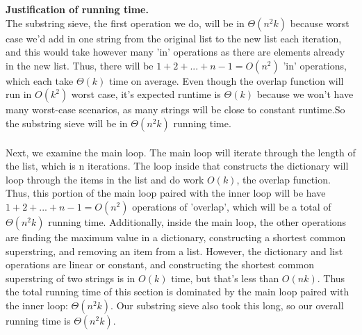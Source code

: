 \documentclass[11pt]{article}
\begin{document}
\noindent
\textbf{Justification of running time.}\\
The substring sieve, the first operation we do, will be in $\Theta(n^2k)$ because worst case we'd add in one string from the original list to the new list each iteration, and this would take however many 'in' operations as there are elements already in the new list. Thus, there will be $1 + 2 + ... + n-1 = O(n^2)$ 'in' operations, which each take $\Theta(k)$ time on average. Even though the overlap function will run in $O(k^2)$ worst case, it's expected runtime is $\Theta(k)$ because we won't have many worst-case scenarios, as many strings will be close to constant runtime.So the substring sieve will be in $\Theta(n^2k)$ running time. \\ 
\\
Next, we examine the main loop. The main loop will iterate through the length of the list, which is n iterations. The loop inside that constructs the dictionary will loop through the items in the list and do work $O(k)$, the overlap function. Thus, this portion of the main loop paired with the inner loop will be have $1 + 2 + ... + n-1 = O(n^2)$ operations of 'overlap', which will be a total of $\Theta(n^2k)$ running time. Additionally, inside the main loop, the other operations are finding the maximum value in a dictionary, constructing a shortest common superstring, and removing an item from a list. However, the dictionary and list operations are linear or constant, and constructing the shortest common superstring of two strings is in $O(k)$ time, but that's less than $O(nk)$. Thus the total running time of this section is dominated by the main loop paired with the inner loop: $\Theta(n^2k)$. Our substring sieve also took this long, so our overall running time is $\Theta(n^2k)$. 
\end{document}
